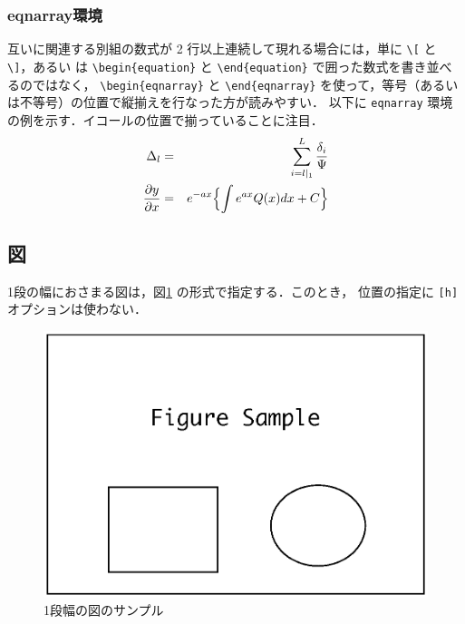 \documentclass[a4j]{matsushita-zemi}
\begin{document}
\subsubsection{eqnarray環境}

互いに関連する別組の数式が 2 行以上連続して現れる場合には，単に
\verb|\[| と \verb|\]|，あるい は \verb|\begin{equation}|
と \verb|\end{equation}| で囲った数式を書き並べるのではなく，
\verb|\begin|\allowbreak\verb|{eqnarray}| と \verb|\end{eqnarray}| 
を使って，等号（あるいは不等号）の位置で縦揃えを行なった方が読みやすい．
以下に \verb|eqnarray| 環境の例を示す．イコールの位置で揃っていることに注目．
%
\begin{eqnarray}
\Delta_l &=& \sum_{i=l|_1}^L\frac{\delta_{i}}{\Psi }\\
\frac{\partial y}{\partial x} &=& e^{-ax} \Bigl\{ \int e^{ax} Q(x)dx + C\Bigl\}
\end{eqnarray}
%

\newpage
\subsection{図}

1段の幅におさまる図は，図\ref{fig:single} の形式で指定する．このとき，
位置の指定に \verb|[h]| オプションは使わない．

\begin{figure}[tb]
  \centering\includegraphics[clip, width=.95\columnwidth]{figureSample.eps}
  \caption{1段幅の図のサンプル}
  \label{fig:single}
\end{figure}
\end{document}

